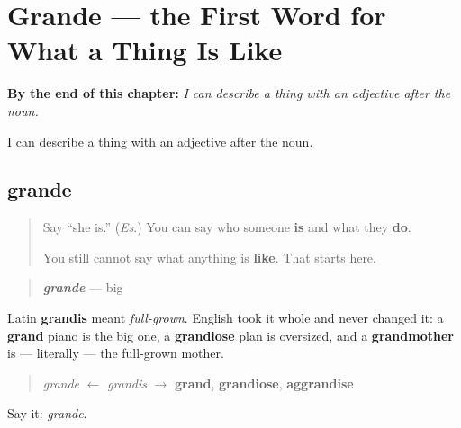 
\chapter{Grande --- the First Word for What a Thing Is Like}
\label{ch:grande}

\begin{chapteropening}
\textbf{By the end of this chapter:} \emph{I can describe a thing with an adjective after the noun.}

I can describe a thing with an adjective after the noun.
\end{chapteropening}

\section[grande]{grande}

\label{lesson:ES-C09-grande}



\begin{quote}
Say \textquotedblleft{}she is.\textquotedblright{} (\emph{Es}.) You can say who someone \textbf{is} and what they \textbf{do}.

You still cannot say what anything is \textbf{like}. That starts here.
\end{quote}

\begin{cousinweb}
\begin{quote}
\emph{\textbf{grande}} — big
\end{quote}

Latin \textbf{grandis} meant \emph{full-grown}. English took it whole and never changed it: a \textbf{grand} piano is the big one, a \textbf{grandiose} plan is oversized, and a \textbf{grandmother} is — literally — the full-grown mother.

\begin{quote}
\emph{grande} $\leftarrow$ \emph{grandis} $\to$ \textbf{grand}, \textbf{grandiose}, \textbf{aggrandise}
\end{quote}

Say it: \emph{grande}.
\end{cousinweb}

